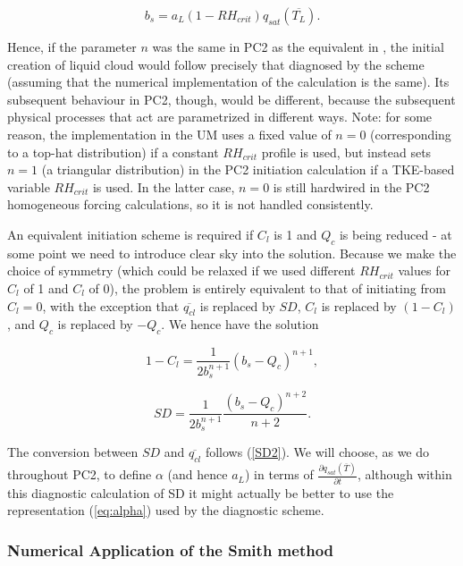 \documentclass{UMDP_article}
\begin{document}
\begin{equation}
b_s = a_L (1 - RH_{crit}) q_{sat} (\overline{T_L}) .
\label{eq:bs}
\end{equation}

Hence, if the parameter $n$ was the same in PC2 as the equivalent
in \cite{smith90}, the
initial creation of liquid cloud would follow precisely that diagnosed
by the \cite{smith90} scheme (assuming that the numerical implementation of
the calculation is the same).
Its subsequent behaviour in PC2, though, would be different, because
the subsequent physical processes that act are parametrized in different
ways.
Note: for some reason, the implementation in the UM uses a fixed value
of $n = 0$ (corresponding to a top-hat distribution) if a constant $RH_{crit}$
profile is used, but instead sets $n = 1$ (a triangular distribution)
in the PC2 initiation calculation if a TKE-based variable $RH_{crit}$ is used.
In the latter case, $n = 0$ is still hardwired in the PC2 homogeneous forcing
calculations, so it is not handled consistently.

An equivalent initiation scheme is required if $C_l$ is 1 and $Q_c$
is being reduced - at some point we need to introduce clear sky into
the solution. Because we make the choice of symmetry (which could be
relaxed if we used different $RH_{crit}$ values for $C_l$ of 1 and $C_l$ of 0),
the problem is entirely equivalent to that of initiating
from $C_l = 0$, with the exception that $\overline{q_{cl}}$ is replaced by $SD$,
$C_l$ is replaced by $(1-C_l)$, and $Q_c$ is replaced by $-Q_c$.
We hence have the solution

\begin{equation}
1 - C_l = \frac{1}{2 b_s^{n+1}} (b_s - Q_c)^{n+1} ,
\label{eq:init1mc}
\end{equation}

\begin{equation}
SD = \frac{1}{2 b_s^{n+1}} \frac{(b_s - Q_c)^{n+2}}{n+2} .
\label{eq:initSD}
\end{equation}

The conversion between $SD$ and $\overline{q_{cl}}$ follows (\ref{SD2}).
We will choose,
as we do throughout PC2, to define $\alpha$ (and hence $a_L$) in terms of
$\frac{\partial q_{sat}(\overline{T})}{\partial t}$, although within
this diagnostic calculation of SD it might actually be better to use
the representation (\ref{eq:alpha}) used by the diagnostic \cite{smith90} scheme.

\subsubsection{Numerical Application of the Smith method}
\label{sec:numapp_init}
\end{document}
